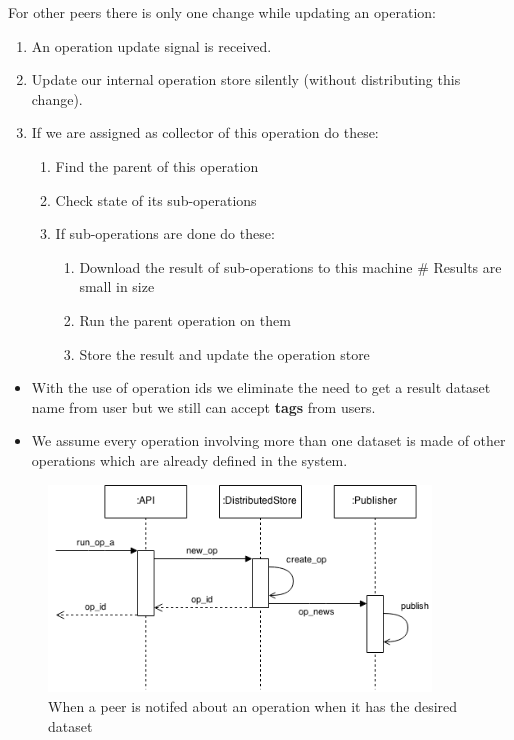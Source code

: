 For other peers there is only one change while updating an operation:
\begin{enumerate}
\item An operation update signal is received.
\item Update our internal operation store silently (without distributing this change).
\item If we are assigned as collector of this operation do these:
  \begin{enumerate}
  \item Find the parent of this operation
  \item Check state of its sub-operations
  \item If sub-operations are done do these:
    \begin{enumerate}
    \item Download the result of sub-operations to this machine \# Results are small in size
    \item Run the parent operation on them
    \item Store the result and update the operation store
    \end{enumerate}
  \end{enumerate}
\end{enumerate}

\begin{itemize}
\item With the use of operation ids we eliminate the need to get a 
result dataset name from user but we still can accept \textbf{tags} from users.
\end{itemize}

\begin{itemize}
\item We assume every operation involving more than one dataset is made of
other operations which are already defined in the system.
\end{itemize}

\begin{figure}[h]
  \centering
  \includegraphics[width=4in]{poster/figures/kseq.png}
  \caption[Sequence diagram showing arrival of an operation message]
   {When a peer is notifed about an operation when it has the desired dataset}
\end{figure}

